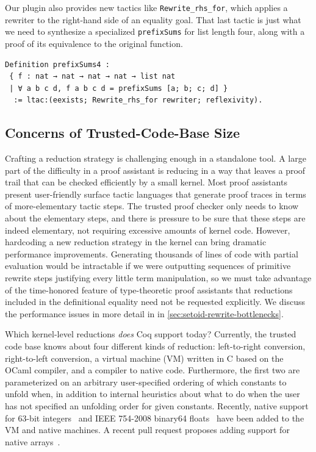 Our plugin also provides new tactics like \texttt{Rewrite_rhs_for}, which applies a rewriter to the right-hand side of an equality goal.
That last tactic is just what we need to synthesize a specialized \texttt{prefixSums} for list length four, along with a proof of its equivalence to the original function.
\begin{verbatim}
Definition prefixSums4 :
 { f : nat → nat → nat → nat → list nat
 | ∀ a b c d, f a b c d = prefixSums [a; b; c; d] }
  := ltac:(eexists; Rewrite_rhs_for rewriter; reflexivity).
\end{verbatim}


\subsection{Concerns of Trusted-Code-Base Size}\label{sec:trusted-code-base-size}

Crafting a reduction strategy is challenging enough in a standalone tool.
A large part of the difficulty in a proof assistant is reducing in a way that leaves a proof trail that can be checked efficiently by a small kernel.
Most proof assistants present user-friendly surface tactic languages that generate proof traces in terms of more-elementary tactic steps.
The trusted proof checker only needs to know about the elementary steps, and there is pressure to be sure that these steps are indeed elementary, not requiring excessive amounts of kernel code.
However, hardcoding a new reduction strategy in the kernel can bring dramatic performance improvements.
Generating thousands of lines of code with partial evaluation would be intractable if we were outputting sequences of primitive rewrite steps justifying every little term manipulation, so we must take advantage of the time-honored feature of type-theoretic proof assistants that reductions included in the definitional equality need not be requested explicitly.
We discuss the performance issues in more detail in  in \autoref{sec:setoid-rewrite-bottlenecks}.

Which kernel-level reductions \emph{does} Coq support today?
Currently, the trusted code base knows about four different kinds of reduction: left-to-right conversion, right-to-left conversion, a virtual machine (VM) written in C based on the OCaml compiler, and a compiler to native code.
Furthermore, the first two are parameterized on an arbitrary user-specified ordering of which constants to unfold when, in addition to internal heuristics about what to do when the user has not specified an unfolding order for given constants.
Recently, native support for 63-bit integers~\cite{coq-pr-int63} and IEEE 754-2008 binary64 floats~\cite{coq-pr-floats} have been added to the VM and native machines.
A recent pull request proposes adding support for native arrays~\cite{coq-pr-parray}.

